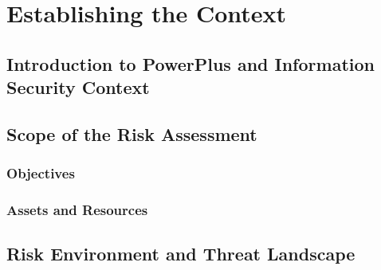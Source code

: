 \chapter{Establishing the Context}

\section{Introduction to PowerPlus and Information Security Context}


\section{Scope of the Risk Assessment}


\subsection{Objectives}


\subsection{Assets and Resources}



\section{Risk Environment and Threat Landscape}


